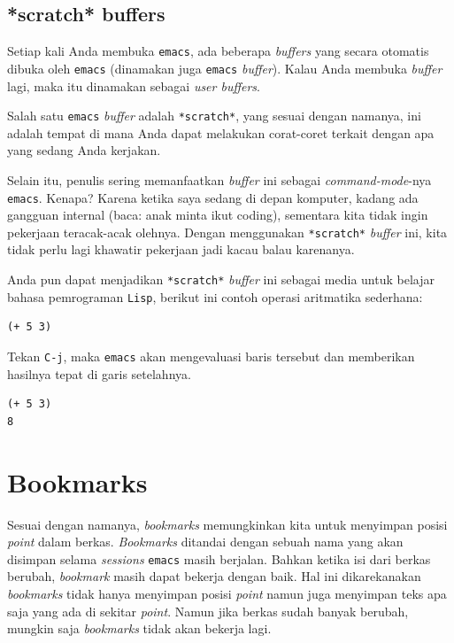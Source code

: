 \documentclass{article}
\begin{document}
\subsection{*scratch* buffers}
Setiap kali Anda membuka \verb=emacs=, ada beberapa \emph{buffers} yang secara
otomatis dibuka oleh \verb=emacs= (dinamakan juga \verb=emacs= \emph{buffer}).
Kalau Anda membuka \emph{buffer} lagi, maka itu dinamakan sebagai 
\emph{user buffers}.

Salah satu \verb=emacs= \emph{buffer} adalah \verb=*scratch*=, yang sesuai
dengan namanya, ini adalah tempat di mana Anda dapat melakukan corat-coret
terkait dengan apa yang sedang Anda kerjakan. 

Selain itu, penulis sering memanfaatkan \emph{buffer} ini sebagai 
\emph{command-mode}-nya \verb=emacs=. Kenapa? Karena ketika saya sedang di
depan komputer, kadang ada gangguan internal (baca: anak minta ikut coding),
sementara kita tidak ingin pekerjaan teracak-acak olehnya. Dengan menggunakan
\verb=*scratch*= \emph{buffer} ini, kita tidak perlu lagi khawatir pekerjaan
jadi kacau balau karenanya.

Anda pun dapat menjadikan \verb=*scratch*= \emph{buffer} ini sebagai media
untuk belajar bahasa pemrograman \verb=Lisp=, berikut ini contoh operasi
aritmatika sederhana:

\begin{verbatim}
(+ 5 3)
\end{verbatim}

Tekan \verb=C-j=, maka \verb=emacs= akan mengevaluasi baris tersebut dan 
memberikan hasilnya tepat di garis setelahnya.

\begin{verbatim}
(+ 5 3)
8
\end{verbatim}

\section{Bookmarks}
Sesuai dengan namanya, \emph{bookmarks} memungkinkan kita untuk menyimpan
posisi \emph{point} dalam berkas. \emph{Bookmarks} ditandai dengan sebuah nama
yang akan disimpan selama \emph{sessions} \verb=emacs= masih berjalan. Bahkan
ketika isi dari berkas berubah, \emph{bookmark} masih dapat bekerja dengan baik.
Hal ini dikarekanakan \emph{bookmarks} tidak hanya menyimpan posisi \emph{point}
namun juga menyimpan teks apa saja yang ada di sekitar \emph{point}. Namun jika
berkas sudah banyak berubah, mungkin saja \emph{bookmarks} tidak akan bekerja
lagi.
\end{document}
